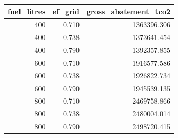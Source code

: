 \begin{tabular}{rrr}
\toprule
fuel_litres & ef_grid & gross_abatement_tco2 \\
\midrule
400 & 0.710 & 1363396.306 \\
400 & 0.738 & 1373641.454 \\
400 & 0.790 & 1392357.855 \\
600 & 0.710 & 1916577.586 \\
600 & 0.738 & 1926822.734 \\
600 & 0.790 & 1945539.135 \\
800 & 0.710 & 2469758.866 \\
800 & 0.738 & 2480004.014 \\
800 & 0.790 & 2498720.415 \\
\bottomrule
\end{tabular}
